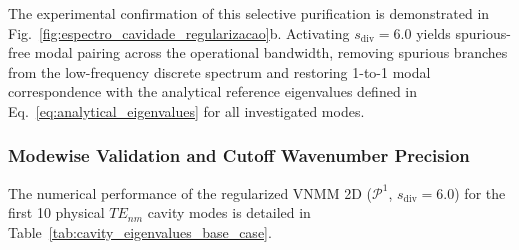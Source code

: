 \documentclass[preprint,12pt]{elsarticle}
\begin{document}
The experimental confirmation of this selective purification is demonstrated in Fig.~\ref{fig:espectro_cavidade_regularizacao}b. Activating $s_{\mathrm{div}} = 6.0$ yields spurious-free modal pairing across the operational bandwidth, removing spurious branches from the low-frequency discrete spectrum and restoring 1-to-1 modal correspondence with the analytical reference eigenvalues defined in Eq.~\eqref{eq:analytical_eigenvalues} for all investigated modes.

\subsubsection{Modewise Validation and Cutoff Wavenumber Precision}
\label{subsubsec:modewise_validation}

The numerical performance of the regularized VNMM 2D ($\mathcal{P}^1$, $s_{\mathrm{div}} = 6.0$) for the first 10 physical $TE_{nm}$ cavity modes is detailed in Table~\ref{tab:cavity_eigenvalues_base_case}.
\end{document}
